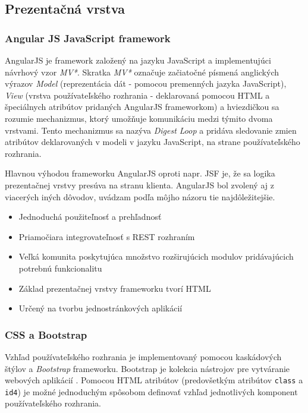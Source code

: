 \documentclass[12pt,oneside]{fithesis2}
\begin{document}
      \subsection{Prezentačná vrstva}
      		\subsubsection{Angular JS JavaScript framework}
      		\par AngularJS je framework založený na jazyku JavaScript a implementujúci návrhový vzor \textit{MV*}. Skratka \textit{MV*} označuje začiatočné písmená anglických výrazov \textit{Model} (reprezentácia dát - pomocou premenných jazyka JavaScript), \textit{View} (vrstva používateľského rozhrania - deklarovaná pomocou HTML a špeciálnych atribútov pridaných AngularJS frameworkom) a hviezdičkou sa rozumie mechanizmus, ktorý umožňuje komunikáciu medzi týmito dvoma vrstvami. Tento mechanizmus sa nazýva \textit{Digest Loop} a pridáva 
sledovanie zmien atribútov deklarovaných v modeli v jazyku JavaScript, na strane používateľského rozhrania\cite{angularudemy}.  
			\par Hlavnou výhodou frameworku AngularJS oproti napr. JSF je, že sa logika prezentačnej vrstvy presúva na stranu klienta. \cite{hades14} AngularJS bol zvolený aj z viacerých iných dôvodov, uvádzam podľa môjho názoru tie najdôležitejšie. 
	\begin{itemize}
		\item Jednoduchá použiteľnosť a prehľadnosť
		\item Priamočiara integrovateľnosť s REST rozhraním
		\item Veľká komunita poskytujúca množstvo rozširujúcich modulov pridávajúcich potrebnú funkcionalitu
		\item Základ prezentačnej vrstvy frameworku tvorí HTML
		\item Určený na tvorbu jednostránkových aplikácií
	\end{itemize} 
	   		
      		\subsubsection{CSS a Bootstrap}
      		\par Vzhľad používateľského rozhrania je implementovaný pomocou kaskádových štýlov a \textit{Bootstrap} frameworku. Bootstrap je kolekcia nástrojov pre vytváranie webových aplikácií \cite{w3c-bootstrap}. Pomocou HTML atribútov (predovšetkým atribútov \texttt{class} a \texttt{id4}) je možné jednoduchým spôsobom definovať vzhľad jednotlivých komponent používateľského rozhrania.   
\end{document}
